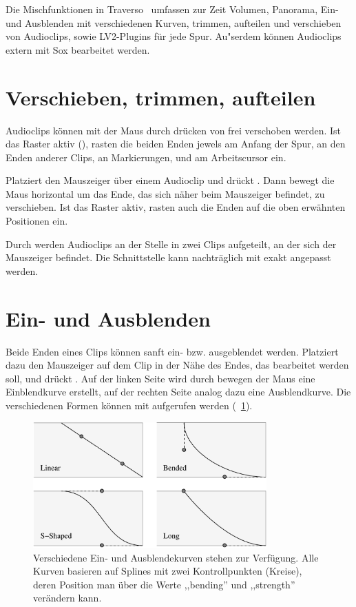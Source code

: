 Die Mischfunktionen in Traverso \Version\ umfassen zur Zeit Volumen, Panorama, Ein- und Ausblenden mit verschiedenen Kurven, trimmen, aufteilen und verschieben von Audioclips, sowie LV2-Plugins für jede Spur. Au"serdem können Audioclips extern mit Sox bearbeitet werden.

\section{Verschieben, trimmen, aufteilen}
Audioclips können mit der Maus durch drücken von  frei verschoben werden. Ist das Raster aktiv (), rasten die beiden Enden jewels am Anfang der Spur, an den Enden anderer Clips, an Markierungen, und am Arbeitscursor ein.

Platziert den Mauszeiger über einem Audioclip und drückt . Dann bewegt die Maus horizontal um das Ende, das sich näher beim Mauszeiger befindet, zu verschieben. Ist das Raster aktiv, rasten auch die Enden auf die oben erwähnten Positionen ein.

Durch  werden Audioclips an der Stelle in zwei Clips aufgeteilt, an der sich der Mauszeiger befindet. Die Schnittstelle kann nachträglich mit  exakt angepasst werden.

\section{Ein- und Ausblenden}
Beide Enden eines Clips können sanft ein- bzw. ausgeblendet werden. Platziert dazu den Mauszeiger auf dem Clip in der Nähe des Endes, das bearbeitet werden soll, und drückt . Auf der linken Seite wird durch bewegen der Maus eine Einblendkurve erstellt, auf der rechten Seite analog dazu eine Ausblendkurve. Die verschiedenen Formen können mit  aufgerufen werden (\FigB~\ref{fig_fades01}).


\begin{figure}[t]
 \centering\includegraphics[width=0.8\textwidth]{../images/fades}
 \caption{Verschiedene Ein- und Ausblendekurven stehen zur Verfügung. Alle Kurven basieren auf Splines mit zwei Kontrollpunkten (Kreise), deren Position man über die Werte ,,bending'' und ,,strength'' verändern kann.}
 \label{fig_fades01}
\end{figure}

